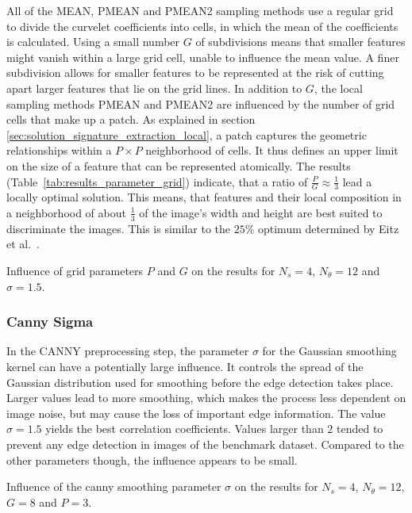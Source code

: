 All of the MEAN, PMEAN and PMEAN2 sampling methods use a regular grid to divide
the curvelet coefficients into cells, in which the mean of the coefficients is
calculated. Using a small number $G$ of subdivisions means that smaller
features might vanish within a large grid cell, unable to influence the mean
value. A finer subdivision allows for smaller features to be represented at the
risk of cutting apart larger features that lie on the grid lines. In addition
to $G$, the local sampling methods PMEAN and PMEAN2 are influenced by the
number of grid cells that make up a patch. As explained in section
\ref{sec:solution_signature_extraction_local}, a patch captures the geometric
relationships within a $P \times P$ neighborhood of cells. It thus defines an
upper limit on the size of a feature that can be represented atomically. The
results (Table~\ref{tab:results_parameter_grid}) indicate, that a ratio of
$\frac{P}{G} \approx \frac{1}{3}$ lead a locally optimal solution. This means,
that features and their local composition in a neighborhood of about
$\frac{1}{3}$ of the image's width and height are best suited to discriminate
the images. This is similar to the $25\%$ optimum determined by Eitz et al.\
\autocite{eitz_sketch-based_2010}.

\begin{table}[h]
    \centering
    \resultsparametergrid
    \caption[Grid Size Parameter Results]{
        Influence of grid parameters $P$ and $G$ on the results for $N_s=4$,
        $N_{\theta}=12$ and $\sigma=1.5$.
    }
    \label{tab:results_parameter_grid}
\end{table}

\FloatBarrier
\subsubsection{Canny Sigma}

In the CANNY preprocessing step, the parameter $\sigma$ for the Gaussian
smoothing kernel can have a potentially large influence. It controls the spread
of the Gaussian distribution used for smoothing before the edge detection takes
place. Larger values lead to more smoothing, which makes the process less
dependent on image noise, but may cause the loss of important edge information.
The value $\sigma = 1.5$ yields the best correlation coefficients. Values
larger than $2$ tended to prevent any edge detection in images of the benchmark
dataset. Compared to the other parameters though, the influence appears to be
small.

\begin{table}[h]
    \centering
    \resultsparametercanny
    \caption[Canny Parameter Results]{
        Influence of the canny smoothing parameter $\sigma$ on the results for
        $N_s=4$, $N_{\theta}=12$, $G=8$ and $P=3$.
    }
    \label{tab:results_parameter_canny}
\end{table}

\FloatBarrier
